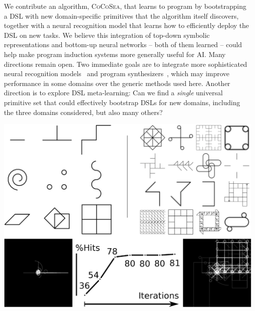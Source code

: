 \documentclass{article}
\newcommand{\systemEnding}{\textsc{CoCoSea}}
\begin{document}
\parbox{0.58\textwidth}{
We contribute an algorithm, \systemEnding, that learns to program by bootstrapping a DSL with new
domain-specific primitives that the algorithm itself discovers,
together with a neural recognition model that learns how to
efficiently deploy the DSL on new tasks. We believe this integration
of top-down symbolic representations and bottom-up neural networks --
both of them learned -- could help make program induction systems more
generally useful for AI. Many directions remain open. Two immediate
goals 
are to integrate more sophisticated neural recognition
models~\cite{devlin2017robustfill} and program
synthesizers~\cite{solar2008program}, which may improve performance in
some domains over the generic methods used here.
Another direction is to
explore DSL meta-learning: Can we find a \emph{single} universal
primitive set that could effectively bootstrap DSLs for new domains,
including the three domains considered,  but also many others?
}\hfill
\begin{minipage}{0.4\textwidth}
  \centering
  \includegraphics[width=\textwidth]{figures/geomCompiled.eps} 
\label{geomCompiled}
\end{minipage}


{\small }
\end{document}
